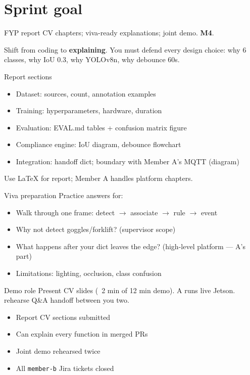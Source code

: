 \documentclass[12pt,a4paper]{report}
\begin{document}
\section{Sprint goal}

FYP report CV chapters; viva-ready explanations; joint demo. \textbf{M4}.

\begin{approachbox}
Shift from coding to \textbf{explaining}. You must defend every design choice: why 6 classes, why IoU 0.3, why YOLOv8n, why debounce 60s.
\end{approachbox}

\begin{stepbox}{Report sections}
\begin{itemize}
    \item Dataset: sources, count, annotation examples
    \item Training: hyperparameters, hardware, duration
    \item Evaluation: EVAL.md tables + confusion matrix figure
    \item Compliance engine: IoU diagram, debounce flowchart
    \item Integration: handoff dict; boundary with Member A's MQTT (diagram)
\end{itemize}
Use LaTeX for report; Member A handles platform chapters.
\end{stepbox}

\begin{stepbox}{Viva preparation}
Practice answers for:
\begin{itemize}
    \item Walk through one frame: detect $\rightarrow$ associate $\rightarrow$ rule $\rightarrow$ event
    \item Why not detect goggles/forklift? (supervisor scope)
    \item What happens after your dict leaves the edge? (high-level platform --- A's part)
    \item Limitations: lighting, occlusion, class confusion
\end{itemize}
\end{stepbox}

\begin{stepbox}{Demo role}
Present CV slides (~2 min of 12 min demo). A runs live Jetson. rehearse Q\&A handoff between you two.
\end{stepbox}

\begin{verifybox}
\begin{itemize}
    \item[$\square$] Report CV sections submitted
    \item[$\square$] Can explain every function in merged PRs
    \item[$\square$] Joint demo rehearsed twice
    \item[$\square$] All \texttt{member-b} Jira tickets closed
\end{itemize}
\end{verifybox}
\end{document}
